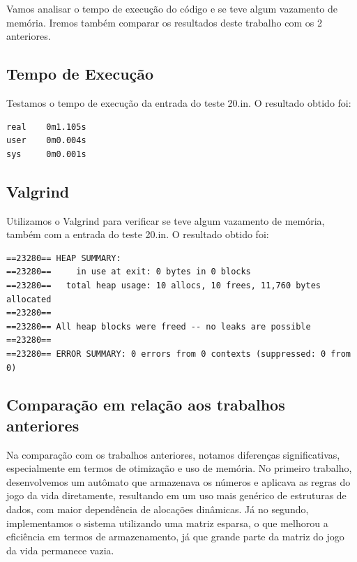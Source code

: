 \documentclass{article}
\begin{document}
\par Vamos analisar o tempo de execução do código e se teve algum vazamento de memória. Iremos também comparar os resultados deste trabalho com os 2 anteriores.

\subsection{Tempo de Execução}
\par Testamos o tempo de execução da entrada do teste 20.in. O resultado obtido foi:

\begin{lstlisting}[caption={},label={lst:cod1},language={[x86masm]Assembler}]
real    0m1.105s
user    0m0.004s
sys     0m0.001s

 \end{lstlisting}

\subsection{Valgrind}
\par Utilizamos o Valgrind para verificar se teve algum vazamento de memória, também com a entrada do teste 20.in. O resultado obtido foi:

\begin{lstlisting}[caption={},label={lst:cod1},language={[x86masm]Assembler}]
==23280== HEAP SUMMARY:
==23280==     in use at exit: 0 bytes in 0 blocks
==23280==   total heap usage: 10 allocs, 10 frees, 11,760 bytes allocated
==23280== 
==23280== All heap blocks were freed -- no leaks are possible
==23280== 
==23280== ERROR SUMMARY: 0 errors from 0 contexts (suppressed: 0 from 0)
 \end{lstlisting}

\subsection{Comparação em relação aos trabalhos anteriores}

\par Na comparação com os trabalhos anteriores, notamos diferenças significativas, especialmente em termos de otimização e uso de memória. No primeiro trabalho, desenvolvemos um autômato que armazenava os números e aplicava as regras do jogo da vida diretamente, resultando em um uso mais genérico de estruturas de dados, com maior dependência de alocações dinâmicas. Já no segundo, implementamos o sistema utilizando uma matriz esparsa, o que melhorou a eficiência em termos de armazenamento, já que grande parte da matriz do jogo da vida permanece vazia.
\end{document}
